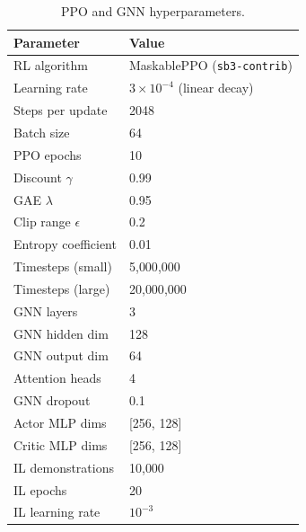 \documentclass[conference]{IEEEtran}
\begin{document}
\begin{table}[ht]
\centering
\caption{PPO and GNN hyperparameters.}
\label{tab:hyperparams}
\begin{tabular}{ll}
\toprule
\textbf{Parameter} & \textbf{Value} \\
\midrule
RL algorithm         & MaskablePPO (\texttt{sb3-contrib}) \\
Learning rate        & $3 \times 10^{-4}$ (linear decay) \\
Steps per update     & 2048 \\
Batch size           & 64 \\
PPO epochs           & 10 \\
Discount $\gamma$    & 0.99 \\
GAE $\lambda$        & 0.95 \\
Clip range $\epsilon$& 0.2 \\
Entropy coefficient  & 0.01 \\
Timesteps (small)    & 5{,}000{,}000 \\
Timesteps (large)    & 20{,}000{,}000 \\
GNN layers           & 3 \\
GNN hidden dim       & 128 \\
GNN output dim       & 64 \\
Attention heads      & 4 \\
GNN dropout          & 0.1 \\
Actor MLP dims       & [256, 128] \\
Critic MLP dims      & [256, 128] \\
IL demonstrations    & 10{,}000 \\
IL epochs            & 20 \\
IL learning rate     & $10^{-3}$ \\
\bottomrule
\end{tabular}
\end{table}




\end{document}
